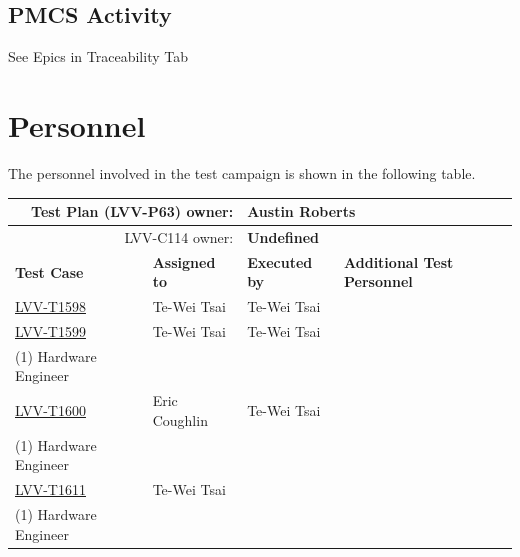 \documentclass[SE,lsstdraft,STR,toc]{lsstdoc}
\begin{document}
  \subsection{PMCS Activity}
  See Epics in Traceability Tab

\newpage
\section{Personnel}
\label{sect:personnel}

The personnel involved in the test campaign is shown in the following table.

\begin{longtable}{p{3cm}p{3cm}p{3cm}p{6cm}}
\hline
\multicolumn{2}{r}{Test Plan (LVV-P63) owner:} &
\multicolumn{2}{l}{\textbf{ Austin Roberts } }\\\hline
\multicolumn{2}{r}{ LVV-C114 owner:} &
\multicolumn{2}{l}{\textbf{
    Undefined
}
} \\\hline
\textbf{Test Case} & \textbf{Assigned to} & \textbf{Executed by} & \textbf{Additional Test Personnel} \\ \hline
\href{https://jira.lsstcorp.org/secure/Tests.jspa#/testCase/LVV-T1598}{LVV-T1598}
& {\small Te-Wei Tsai } & {\small Te-Wei Tsai } &
\begin{minipage}[]{6cm}
\smallskip
{\small  }
\medskip
\end{minipage}
\\ \hline
\href{https://jira.lsstcorp.org/secure/Tests.jspa#/testCase/LVV-T1599}{LVV-T1599}
& {\small Te-Wei Tsai } & {\small Te-Wei Tsai } &
\begin{minipage}[]{6cm}
\smallskip
{\small (1) Software Engineer\\
(1) Hardware Engineer }
\medskip
\end{minipage}
\\ \hline
\href{https://jira.lsstcorp.org/secure/Tests.jspa#/testCase/LVV-T1600}{LVV-T1600}
& {\small Eric Coughlin } & {\small Te-Wei Tsai } &
\begin{minipage}[]{6cm}
\smallskip
{\small (1) Software Engineer\\
(1) Hardware Engineer }
\medskip
\end{minipage}
\\ \hline
\href{https://jira.lsstcorp.org/secure/Tests.jspa#/testCase/LVV-T1611}{LVV-T1611}
& {\small Te-Wei Tsai } & {\small  } &
\begin{minipage}[]{6cm}
\smallskip
{\small (1) Software Engineer\\
(1) Hardware Engineer }
\medskip
\end{minipage}
\\ \hline
\end{longtable}
\end{document}
